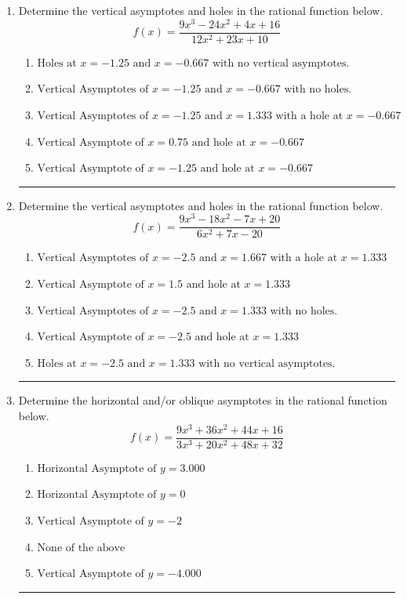 \documentclass[14pt]{extbook}
\newcommand{\litem}[1]{\item#1\hspace*{-1cm}\rule{\textwidth}{0.4pt}}
\begin{document}
\begin{enumerate}
{\begin{enumerate}[label=\Alph*.]
\end{enumerate} }
\litem{
Determine the vertical asymptotes and holes in the rational function below.\[ f(x) = \frac{9x^{3} -24 x^{2} +4 x + 16}{12x^{2} +23 x + 10} \]\begin{enumerate}[label=\Alph*.]
\item \( \text{Holes at } x = -1.25 \text{ and } x = -0.667 \text{ with no vertical asymptotes.} \)
\item \( \text{Vertical Asymptotes of } x = -1.25 \text{ and } x = -0.667 \text{ with no holes.} \)
\item \( \text{Vertical Asymptotes of } x = -1.25 \text{ and } x = 1.333 \text{ with a hole at } x = -0.667 \)
\item \( \text{Vertical Asymptote of } x = 0.75 \text{ and hole at } x = -0.667 \)
\item \( \text{Vertical Asymptote of } x = -1.25 \text{ and hole at } x = -0.667 \)

\end{enumerate} }
\litem{
Determine the vertical asymptotes and holes in the rational function below.\[ f(x) = \frac{9x^{3} -18 x^{2} -7 x + 20}{6x^{2} +7 x -20} \]\begin{enumerate}[label=\Alph*.]
\item \( \text{Vertical Asymptotes of } x = -2.5 \text{ and } x = 1.667 \text{ with a hole at } x = 1.333 \)
\item \( \text{Vertical Asymptote of } x = 1.5 \text{ and hole at } x = 1.333 \)
\item \( \text{Vertical Asymptotes of } x = -2.5 \text{ and } x = 1.333 \text{ with no holes.} \)
\item \( \text{Vertical Asymptote of } x = -2.5 \text{ and hole at } x = 1.333 \)
\item \( \text{Holes at } x = -2.5 \text{ and } x = 1.333 \text{ with no vertical asymptotes.} \)

\end{enumerate} }
\litem{
Determine the horizontal and/or oblique asymptotes in the rational function below.\[ f(x) = \frac{9x^{3} +36 x^{2} +44 x + 16}{3x^{3} +20 x^{2} +48 x + 32} \]\begin{enumerate}[label=\Alph*.]
\item \( \text{Horizontal Asymptote of } y = 3.000  \)
\item \( \text{Horizontal Asymptote of } y = 0  \)
\item \( \text{Vertical Asymptote of } y = -2  \)
\item \( \text{None of the above} \)
\item \( \text{Vertical Asymptote of } y = -4.000  \)


\end{enumerate}}
\end{enumerate}
\end{document}
